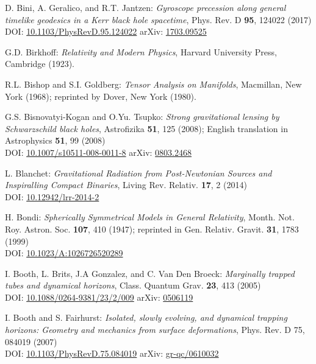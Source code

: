 \begin{thebibliography}{123}
D. Bini, A. Geralico, and R.T. Jantzen:
{\em Gyroscope precession along general timelike geodesics in a Kerr black hole spacetime},
Phys. Rev. D {\bf 95}, 124022 (2017)\\
DOI: \href{https://doi.org/10.1103/PhysRevD.95.124022}{10.1103/PhysRevD.95.124022}\hfill
arXiv: \href{https://arxiv.org/abs/1703.09525}{1703.09525}

G.D. Birkhoff:
{\em Relativity and Modern Physics},
Harvard University Press, Cambridge (1923).

R.L. Bishop and S.I. Goldberg:
{\em Tensor Analysis on Manifolds},
Macmillan, New York (1968); reprinted by Dover, New York (1980).

G.S. Bisnovatyi-Kogan and O.Yu. Tsupko:
{\em Strong gravitational lensing by Schwarzschild black holes},
Astrofizika {\bf 51}, 125 (2008); English translation in
Astrophysics {\bf 51}, 99 (2008)\\
DOI: \href{https://doi.org/10.1007/s10511-008-0011-8}{10.1007/s10511-008-0011-8}\hfill
arXiv: \href{https://arxiv.org/abs/0803.2468}{0803.2468}

L. Blanchet:
{\em Gravitational Radiation from Post-Newtonian Sources and Inspiralling Compact Binaries},
Living Rev. Relativ. {\bf 17}, 2 (2014)\\
DOI: \href{https://doi.org/10.12942/lrr-2014-2}{10.12942/lrr-2014-2}\hfill

H. Bondi:
{\em Spherically Symmetrical Models in General Relativity},
Month. Not. Roy. Astron. Soc. {\bf 107}, 410 (1947);
reprinted in
Gen. Relativ. Gravit. {\bf 31}, 1783 (1999)\\
DOI: \href{https://doi.org/10.1023/A:1026726520289}{10.1023/A:1026726520289}

I. Booth, L. Brits, J.A Gonzalez, and C. Van Den Broeck:
{\em Marginally trapped tubes and dynamical horizons},
Class. Quantum Grav. {\bf 23}, 413 (2005)\\
DOI: \href{https://doi.org/10.1088/0264-9381/23/2/009}{10.1088/0264-9381/23/2/009}\hfill
arXiv: \href{https://arxiv.org/abs/gr-qc/0506119}{0506119}

I. Booth and S. Fairhurst:
{\em Isolated, slowly evolving, and dynamical trapping horizons: Geometry and mechanics from surface deformations},
Phys. Rev. D 75, 084019 (2007)\\
DOI: \href{https://doi.org/10.1103/PhysRevD.75.084019}{10.1103/PhysRevD.75.084019}\hfill
arXiv: \href{https://arxiv.org/abs/gr-qc/0610032}{gr-qc/0610032}


\end{thebibliography}
